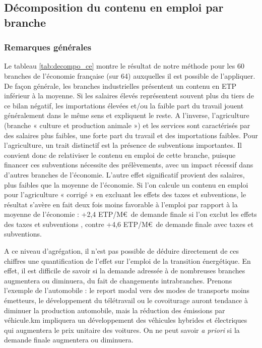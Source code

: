 \subsection{Décomposition du contenu en emploi par branche}

\subsubsection{Remarques générales}

Le tableau \ref{tab:decompo_ce} montre le résultat de notre méthode pour les 60 branches de l’économie française (sur 64) auxquelles il est possible de l’appliquer. 
De façon générale, les branches industrielles présentent un contenu en ETP inférieur à la moyenne. Si les salaires élevés représentent souvent plus du tiers de ce bilan négatif, les importations élevées et/ou la faible part du travail jouent généralement dans le même sens et expliquent le reste. 
A l’inverse, l’agriculture (branche « culture et production animale ») et les services sont caractérisés par des salaires plus faibles, une forte part du travail et des importations faibles. 
Pour l’agriculture, un trait distinctif est la présence de subventions importantes. Il convient donc de relativiser le contenu en emploi de cette branche, puisque financer ces subventions nécessite des prélèvements, avec un impact récessif dans d’autres branches de l’économie. 
L’autre effet significatif provient des salaires, plus faibles que la moyenne de l’économie. Si l’on calcule un contenu en emploi pour l’agriculture « corrigé » en excluant les effets des taxes et subventions, le résultat s’avère en fait deux fois moins favorable à l'emploi par rapport à la moyenne de l'économie : +2,4 ETP/M\euro~de demande finale si l'on exclut les effets des taxes et subventions , contre +4,6 ETP/M\euro~de demande finale avec taxes et subventions. 

A ce niveau d’agrégation, il n’est pas possible de déduire directement de ces chiffres une quantification de l’effet sur l’emploi de la transition énergétique. En effet, il est difficile de savoir si la demande adressée à de nombreuses branches augmentera ou diminuera, du fait de changements intrabranches. 
Prenons l’exemple de l’automobile : le report modal vers des modes de transports moins émetteurs, le développement du télétravail ou le covoiturage auront tendance à diminuer la production automobile, mais la réduction des émissions par véhicule.km impliquera un développement des véhicules hybrides et électriques qui augmentera le prix unitaire des voitures. 
On ne peut savoir \textit{a priori} si la demande finale augmentera ou diminuera. 


